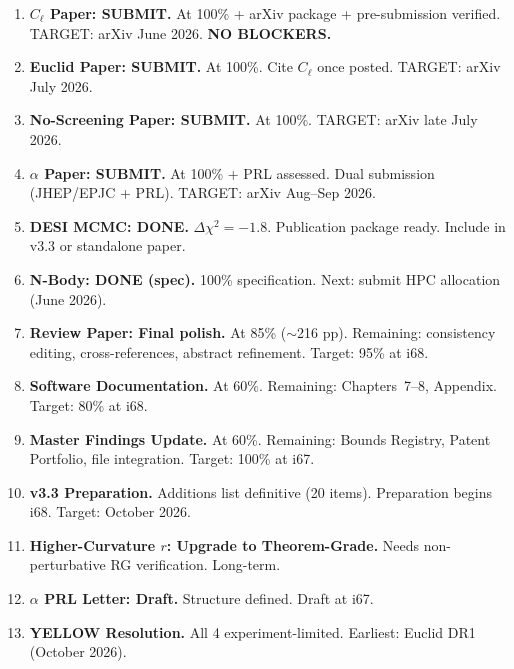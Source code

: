 \documentclass[11pt,a4paper]{article}
\begin{document}
\begin{enumerate}[label=\textbf{P\arabic*.}]
\item \textbf{$C_\ell$ Paper: SUBMIT.} At 100\% + arXiv package + pre-submission verified. TARGET: arXiv June 2026. \textbf{NO BLOCKERS.}

\item \textbf{Euclid Paper: SUBMIT.} At 100\%. Cite $C_\ell$ once posted. TARGET: arXiv July 2026.

\item \textbf{No-Screening Paper: SUBMIT.} At 100\%. TARGET: arXiv late July 2026.

\item \textbf{$\alpha$ Paper: SUBMIT.} At 100\% + PRL assessed. Dual submission (JHEP/EPJC + PRL). TARGET: arXiv Aug--Sep 2026.

\item \textbf{DESI MCMC: DONE.} $\Delta\chi^2 = -1.8$. Publication package ready. Include in v3.3 or standalone paper.

\item \textbf{N-Body: DONE (spec).} 100\% specification. Next: submit HPC allocation (June 2026).

\item \textbf{Review Paper: Final polish.} At 85\% ($\sim$216 pp). Remaining: consistency editing, cross-references, abstract refinement. Target: 95\% at i68.

\item \textbf{Software Documentation.} At 60\%. Remaining: Chapters~7--8, Appendix. Target: 80\% at i68.

\item \textbf{Master Findings Update.} At 60\%. Remaining: Bounds Registry, Patent Portfolio, file integration. Target: 100\% at i67.

\item \textbf{v3.3 Preparation.} Additions list definitive (20 items). Preparation begins i68. Target: October 2026.

\item \textbf{Higher-Curvature $r$: Upgrade to Theorem-Grade.} Needs non-perturbative RG verification. Long-term.

\item \textbf{$\alpha$ PRL Letter: Draft.} Structure defined. Draft at i67.

\item \textbf{YELLOW Resolution.} All 4 experiment-limited. Earliest: Euclid DR1 (October 2026).
\end{enumerate}
\end{document}
